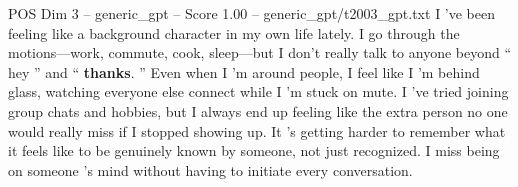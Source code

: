 \begin{textsample}{POS Dim 3 – generic\_gpt – Score 1.00 – generic\_gpt/t2003\_gpt.txt}  \label{ex:f3_pos_040}
I ’ve been feeling like a background character in my own life lately.
I go through the motions—work, commute, cook, sleep—but I don't really talk to anyone beyond “ hey ” and “ \textbf{thanks}. ” Even when I ’m around people, I feel like I ’m behind glass, watching everyone else connect while I ’m stuck on mute.
I ’ve tried joining group chats and hobbies, but I always end up feeling like the extra person no one would really miss if I stopped showing up.
It ’s getting harder to remember what it feels like to be genuinely known by someone, not just recognized.
I miss being on someone ’s mind without having to initiate every conversation.

\end{textsample}
